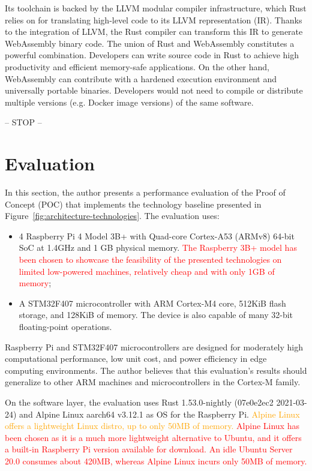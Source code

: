 Its toolchain is backed by the LLVM modular compiler infrastructure, which Rust relies on for translating high-level code to its LLVM representation (IR). Thanks to the integration of LLVM, the Rust compiler can transform this IR to generate WebAssembly binary code. The union of Rust and WebAssembly constitutes a powerful combination. Developers can write source code in Rust to achieve high productivity and efficient memory-safe applications. On the other hand, WebAssembly can contribute with a hardened execution environment and universally portable binaries. Developers would not need to compile or distribute multiple versions (e.g. Docker image versions) of the same software.

-- STOP --

\section{Evaluation}
\label{sec:evaluation}

In this section, the author presents a performance evaluation of the Proof of Concept (POC) that implements the technology baseline presented in Figure~\ref{fig:architecture-technologies}. The evaluation uses:

\begin{itemize}
    \item 4 Raspberry Pi 4 Model 3B+ with Quad-core Cortex-A53 (ARMv8) 64-bit SoC at 1.4GHz and 1 GB physical memory. \textcolor{red}{The Raspberry 3B+ model has been chosen to showcase the feasibility of the presented technologies on limited low-powered machines, relatively cheap and with only 1GB of memory};
    \item A STM32F407 microcontroller with ARM Cortex-M4 core, 512KiB flash storage, and 128KiB of memory. The device is also capable of many 32-bit floating-point operations.
\end{itemize}

Raspberry Pi and STM32F407 microcontrollers are designed for moderately high computational performance, low unit cost, and power efficiency in edge computing environments. The author believes that this evaluation's results should generalize to other ARM machines and microcontrollers in the Cortex-M family.

On the software layer, the evaluation uses Rust 1.53.0-nightly (07e0e2ec2 2021-03-24) and Alpine Linux aarch64 v3.12.1 as OS for the Raspberry Pi. 
\textcolor{orange}{Alpine Linux offers a lightweight Linux distro, up to only 50MB of memory.}
\textcolor{red}{Alpine Linux has been chosen as it is a much more lightweight alternative to Ubuntu, and it offers a built-in Raspberry Pi version available for download. An idle Ubuntu Server 20.0 consumes about 420MB, whereas Alpine Linux incurs only 50MB of memory.}

